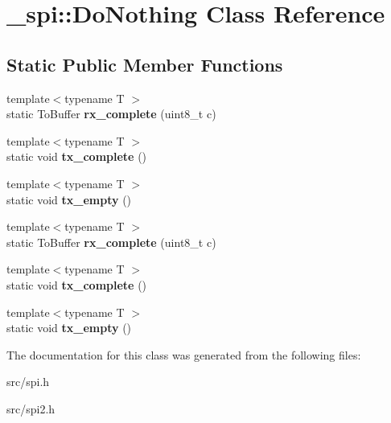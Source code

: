 \hypertarget{class__spi_1_1DoNothing}{}\section{\+\_\+spi\+:\+:Do\+Nothing Class Reference}
\label{class__spi_1_1DoNothing}
\subsection*{Static Public Member Functions}
\begin{DoxyCompactItemize}
\item 
{\footnotesize template$<$typename T $>$ }\\static To\+Buffer {\bfseries rx\+\_\+complete} (uint8\+\_\+t c)\hypertarget{class__spi_1_1DoNothing_a507607de4acbe431f6072a72818b2851}{}\label{class__spi_1_1DoNothing_a507607de4acbe431f6072a72818b2851}

\item 
{\footnotesize template$<$typename T $>$ }\\static void {\bfseries tx\+\_\+complete} ()\hypertarget{class__spi_1_1DoNothing_a36a7cc79efa9bc687c9f8dec0f7bbc12}{}\label{class__spi_1_1DoNothing_a36a7cc79efa9bc687c9f8dec0f7bbc12}

\item 
{\footnotesize template$<$typename T $>$ }\\static void {\bfseries tx\+\_\+empty} ()\hypertarget{class__spi_1_1DoNothing_a385c89efefa7c63d1f172c81bc53a060}{}\label{class__spi_1_1DoNothing_a385c89efefa7c63d1f172c81bc53a060}

\item 
{\footnotesize template$<$typename T $>$ }\\static To\+Buffer {\bfseries rx\+\_\+complete} (uint8\+\_\+t c)\hypertarget{class__spi_1_1DoNothing_a507607de4acbe431f6072a72818b2851}{}\label{class__spi_1_1DoNothing_a507607de4acbe431f6072a72818b2851}

\item 
{\footnotesize template$<$typename T $>$ }\\static void {\bfseries tx\+\_\+complete} ()\hypertarget{class__spi_1_1DoNothing_a36a7cc79efa9bc687c9f8dec0f7bbc12}{}\label{class__spi_1_1DoNothing_a36a7cc79efa9bc687c9f8dec0f7bbc12}

\item 
{\footnotesize template$<$typename T $>$ }\\static void {\bfseries tx\+\_\+empty} ()\hypertarget{class__spi_1_1DoNothing_a385c89efefa7c63d1f172c81bc53a060}{}\label{class__spi_1_1DoNothing_a385c89efefa7c63d1f172c81bc53a060}

\end{DoxyCompactItemize}


The documentation for this class was generated from the following files\+:\begin{DoxyCompactItemize}
\item 
src/spi.\+h\item 
src/spi2.\+h\end{DoxyCompactItemize}
